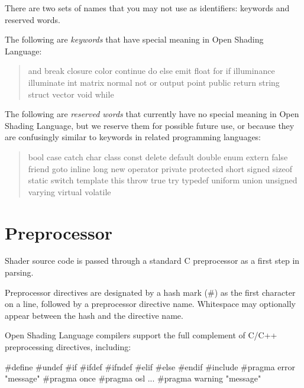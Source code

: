 \documentclass[11pt,letterpaper]{book}
\def\langname{Open Shading Language\xspace}
\begin{document}
There are two sets of names that you may not use as identifiers:
keywords and reserved words.

The following are \emph{keywords} that have special meaning in
\langname: 

\begin{quote} {\cf

and break closure color continue do else emit float for if illuminance
illuminate int matrix normal not or output point public return string struct
vector void while

}
\end{quote}

The following are \emph{reserved words} that currently have no special
meaning in \langname, but we reserve them for possible future use, or
because they are confusingly similar to keywords in related programming
languages: 

\begin{quote} {\cf

bool case catch char class const delete default double 
enum extern false friend
goto inline long new operator private protected 
short signed sizeof static 
switch template this throw true try typedef 
uniform union unsigned varying virtual volatile

}
\end{quote}


\section{Preprocessor}
\label{sec:preprocessor}
 

Shader source code is passed through a standard C preprocessor as a
first step in parsing.  

Preprocessor directives are designated by a hash mark ({\cf \#}) as the
first character on a line, followed by a preprocessor directive name.
Whitespace may optionally appear between the hash and the directive
name.

\langname compilers support the full complement of C/C++ preprocessing
directives, including:

\begin{code}
    #define
    #undef
    #if
    #ifdef
    #ifndef
    #elif
    #else
    #endif
    #include
    #pragma error "message"
    #pragma once
    #pragma osl ...
    #pragma warning "message"
\end{code}
\end{document}
